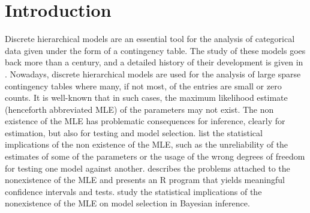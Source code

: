 \documentclass[aos,noinfoline]{imsart}
\theoremstyle{remark}
\theoremstyle{definition}
\begin{document}
\section{Introduction}
Discrete hierarchical models are an essential tool for the  analysis of categorical data given under the form of a contingency table.  
The study of these models goes back more than a century, and a detailed history of  their development is given in \citet{FienbergRinaldo07:three_centuries}. Nowadays, discrete hierarchical models are used for the analysis of large sparse contingency tables where many, if not most, of the entries are small or zero counts. It is well-known that in such cases, the maximum likelihood estimate (henceforth abbreviated MLE)  of the parameters may not exist. The non existence of the MLE has problematic consequences for inference, clearly for estimation, but also for testing and model selection.  \citet{FienbergRinaldo12:MLE_in_loglinear_models}  list the statistical implications of the non existence of the MLE, such as the unreliability of the estimates of some of the parameters or the usage of the wrong degrees of freedom for testing one model against another.
\citet{Geyer09:Likelihood_inference_in_exponential_families} describes the problems attached to the nonexistence of the MLE and presents an R program that yields meaningful confidence intervals and tests.  \citet{LetacMassam12:Bayes_regularization} study the statistical implications of the nonexistence of the MLE on model selection in Bayesian inference.
\end{document}
